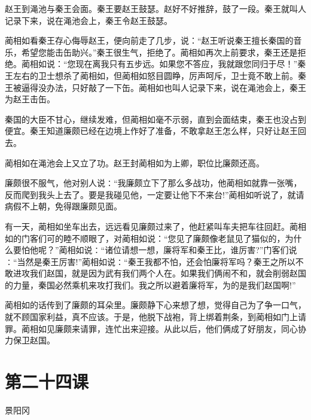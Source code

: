 \documentclass[12pt,UTF8]{ctexbook}
\begin{document}
赵王到渑池与秦王会面。秦王要赵王鼓瑟。赵好不好推辞，鼓了一段。秦王就叫人记录下来，说在渑池会上，秦王令赵王鼓瑟。

蔺相如看秦王存心侮辱赵王，便向前走了几步，说：“赵王听说秦王擅长秦国的音乐，希望您能击缶助兴。”秦王很生气，拒绝了。蔺相如再次上前要求，秦王还是拒绝。蔺相如说：“您现在离我只有五步远。如果您不答应，我就跟您同归于尽！”秦王左右的卫士想杀了蔺相如，但蔺相如怒目圆睁，厉声呵斥，卫士竟不敢上前。秦王被逼得没办法，只好敲了一下缶。蔺相如也叫人记录下来，说在渑池会上，秦王为赵王击缶。

秦国的大臣不甘心，继续发难，但蔺相如毫不示弱，直到会面结束，秦王也没占到便宜。秦王知道廉颇已经在边境上作好了准备，不敢拿赵王怎么样，只好让赵王回去。

蔺相如在渑池会上又立了功。赵王封蔺相如为上卿，职位比廉颇还高。

廉颇很不服气，他对别人说∶“我廉颇立下了那么多战功，他蔺相如就靠一张嘴，反而爬到我头上去了。要是我碰见他，一定要让他下不来台!”蔺相如听说了，就请病假不上朝，免得跟廉颇见面。

有一天，蔺相如坐车出去，远远看见廉颇过来了，他赶紧叫车夫把车往回赶。蔺相如的门客们可的睦不顺眼了，对蔺相如说：“您见了廉颇像老鼠见了猫似的，为什么要怕他呢？”蔺相如说∶“诸位请想一想，廉将军和秦王比，谁厉害?”门客们说∶“当然是秦王厉害!”蔺相如说∶“秦王我都不怕，还会怕廉将军吗？秦王之所以不敢进攻我们赵国，就是因为武有我们两个人在。如果我们俩闹不和，就会削弱赵国的力量，秦国必然乘机来攻打我们。我之所以避着廉将军，为的是我们赵国啊!”

蔺相如的话传到了廉颇的耳朵里。廉颇静下心来想了想，觉得自己为了争一口气，就不顾国家利益，真不应该。于是，他脱下战袍，背上绑着荆条，到蔺相如门上请罪。蔺相如见廉颇来请罪，连忙出来迎接。从此以后，他们俩成了好朋友，同心协力保卫赵国。

\section{第二十四课}

景阳冈
\end{document}
